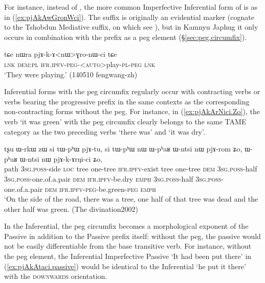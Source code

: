 For instance, instead of , the more common Imperfective Inferential form of   is  as in (\ref{ex:pjAkAwGronWci}). The  suffix is originally an evidential marker (cognate to the Tshobdun   Mediative suffix, on which see \citealt[564]{jackson17tshobdun}), but in Kamnyu Japhug it only occurs in combination with the  prefix as a peg element (§\ref{sec:peg.circumfix}).

\begin{exe}
\ex \label{ex:pjAkAwGronWci}
 \gll  tɕe nɯra pjɤ-k-ɤ<nɯ>ɣro-nɯ-ci tɕe \\
 \textsc{lnk} \textsc{dem}:\textsc{pl} \textsc{ifr}.\textsc{ipfv}-\textsc{peg}-<\textsc{auto}>play-\textsc{pl}-\textsc{peg} \textsc{lnk} \\
 \glt `They were playing.' (140510 fengwang-zh) 
\end{exe}

Inferential forms with the peg circumfix   regularly occur with contracting verbs or verbs bearing the progressive prefix in the same contexts as the corresponding non-contracting forms without the peg. For instance, in (\ref{ex:pjAkArNici.Zo}), the verb  `it was green' with the peg circumfix clearly belongs to the same TAME category as the two preceding verbs   `there was' and  `it was dry'. 
 
\begin{exe}
\ex \label{ex:pjAkArNici.Zo}
 \gll  tʂu ɯ-rkɯ zɯ si tɯ-pʰɯ pjɤ-tu,  si tɯ-pʰɯ nɯ ɯ-pʰaʁ ɯ-ntsi nɯ pjɤ-rom ʑo, ɯ-pʰaʁ ɯ-ntsi nɯ pjɤ-k-ɤrŋi-ci ʑo,\\
path \textsc{3sg}.\textsc{poss}-side \textsc{loc} tree one-tree \textsc{ifr}.\textsc{ipfv}-exist tree one-tree \textsc{dem} \textsc{3sg}.\textsc{poss}-half \textsc{3sg}.\textsc{poss}-one.of.a.pair \textsc{dem} \textsc{ifr}.\textsc{ipfv}-be.dry \textsc{emph} \textsc{3sg}.\textsc{poss}-half \textsc{3sg}.\textsc{poss}-one.of.a.pair \textsc{dem} \textsc{ifr}.\textsc{ipfv}-\textsc{peg}-be.green-\textsc{peg} \textsc{emph}\\
\glt `On the side of the road, there was a tree, one half of that tree was dead and the other half was green. (The divination2002)
\end{exe}

In the Inferential, the peg circumfix becomes a morphological exponent of the Passive in addition to the Passive prefix  itself: without the peg, the passive would not be easily differentiable from the base transitive verb. For instance, without the peg element, the Inferential Imperfective Passive  `It had been put there' in (\ref{ex:pjAkAtaci.passive}) would be identical to the Inferential  `he put it there' with the \textsc{downwards} orientation.

